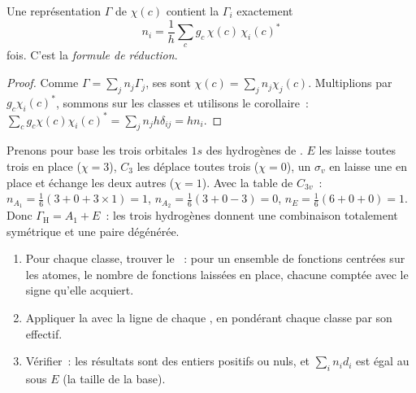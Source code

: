 \begin{theorem}\label{thm:b3:group-theory-applied:reduction}
Une représentation $\Gamma$ de  $\chi(c)$ contient la
 $\Gamma_i$ exactement
\[
n_i = \frac1h\sum_cg_c\,\chi(c)\,\chi_i(c)^*
\]
fois. C'est la \emph{formule de réduction}.
\end{theorem}

\begin{proof}
Comme $\Gamma = \sum_jn_j\Gamma_j$, ses  sont $\chi(c) = \sum_jn_j\chi_j(c)$.
Multiplions par $g_c\chi_i(c)^*$, sommons sur les classes et utilisons le
corollaire~:
$\sum_cg_c\chi(c)\chi_i(c)^* = \sum_jn_jh\delta_{ij} = hn_i$.
\end{proof}

\begin{example}\label{ex:b3:group-theory-applied:nh3}
Prenons pour base les trois orbitales $1s$ des hydrogènes de .
$E$ les laisse toutes trois en place ($\chi = 3$), $C_3$ les déplace
toutes trois ($\chi = 0$), un
$\sigma_v$ en laisse une en place et échange les deux autres
($\chi = 1$). Avec la table de $C_{3v}$~:
$n_{A_1} = \frac16(3 + 0 + 3\times1) = 1$, $n_{A_2} = \frac16(3 + 0 - 3) = 0$,
$n_E = \frac16(6 + 0 + 0) = 1$. Donc $\Gamma_{\mathrm H} = A_1 + E$~: les
trois hydrogènes donnent une combinaison totalement symétrique et une
paire dégénérée.
\end{example}

\begin{method}\label{met:b3:group-theory-applied:reduce}
\begin{enumerate}
  \item Pour chaque classe, trouver le ~: pour un ensemble de
        fonctions centrées sur les atomes, le nombre de fonctions laissées
        en place, chacune comptée avec le signe qu'elle acquiert.
  \item Appliquer la  avec la ligne de chaque
        , en pondérant chaque classe par son
        effectif.
  \item Vérifier~: les résultats sont des entiers positifs ou nuls, et
        $\sum_in_id_i$ est égal au  sous $E$ (la taille de la
        base).
\end{enumerate}
\end{method}

